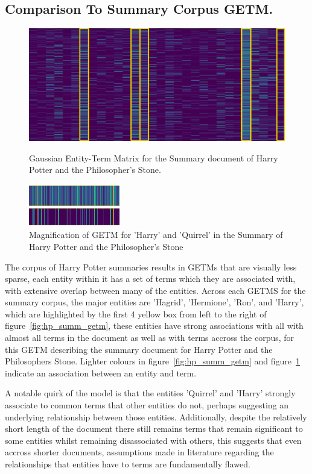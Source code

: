 \documentclass[10pt]{report}
\begin{document}
\subsection{Comparison To Summary Corpus GETM.}
\begin{figure}[h!]
  \centering
  \includegraphics[scale=0.4]{hp_getm_summ_vis}
\caption{Gaussian Entity-Term Matrix for the Summary document of Harry Potter and the Philosopher's Stone.\label{fig:hp_summ_getm}}
  \centering
  \includegraphics[scale=1.2]{harry_quirrel_compare}
\caption{Magnification of GETM for 'Harry' and 'Quirrel' in the Summary of Harry Potter and the Philosopher's Stone \label{fig:harry_quirrel_compare}}
\end{figure}
\renewcommand{\baselinestretch}{2.0}\normalsize
\renewcommand{\arraystretch}{1.0}
The corpus of Harry Potter summaries results in GETMs that are visually less sparse, each entity within it has a set of terms which they are associated with, with extensive overlap between many of the entities. Across each GETMS for the summary corpus, the major entities are 'Hagrid', 'Hermione', 'Ron', and 'Harry', which are highlighted by the first 4 yellow box from left to the right of figure~\ref{fig:hp_summ_getm}, these entities have strong associations with all with almost all terms in the document as well as with terms accross the corpus, for this GETM describing the summary document for Harry Potter and the Philosophers Stone. Lighter colours in figure~\ref{fig:hp_summ_getm} and figure~\ref{fig:harry_quirrel_compare} indicate an association between an entity and term.

A notable quirk of the model is that the entities 'Quirrel' and 'Harry' strongly associate to common terms that other entities do not, perhaps suggesting an  underlying relationship between those entities. Additionally, despite the relatively short length of the document there still remains terms that remain significant to some entities whilst remaining disassociated with others, this suggests that even accross shorter documents, assumptions made in literature regarding the relationships that entities have to terms are fundamentally flawed.
\end{document}
